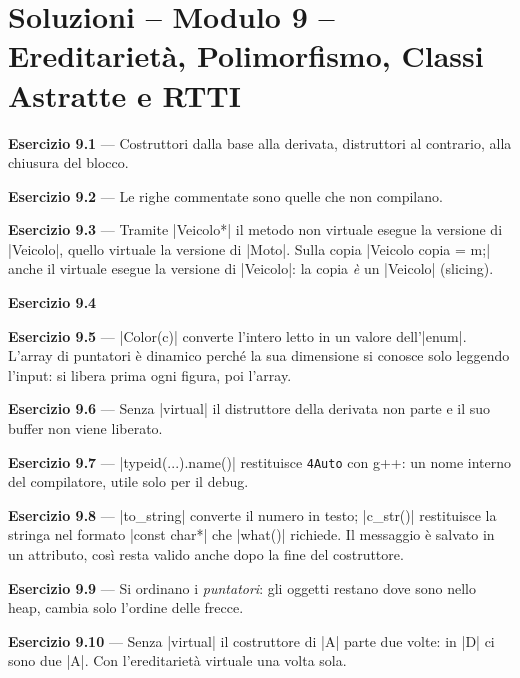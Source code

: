 \chapter{Soluzioni -- Modulo 9 -- Ereditarietà, Polimorfismo, Classi Astratte e RTTI}

\textbf{Esercizio 9.1} --- Costruttori dalla base alla derivata, distruttori al
contrario, alla chiusura del blocco.

\textbf{Esercizio 9.2} --- Le righe commentate sono quelle che non compilano.

\textbf{Esercizio 9.3} --- Tramite \cc|Veicolo*| il metodo non virtuale esegue la
versione di \cc|Veicolo|, quello virtuale la versione di \cc|Moto|. Sulla copia
\cc|Veicolo copia = m;| anche il virtuale esegue la versione di \cc|Veicolo|: la copia
\emph{è} un \cc|Veicolo| (slicing).

\textbf{Esercizio 9.4}

\textbf{Esercizio 9.5} --- \cc|Color(c)| converte l'intero letto in un valore
dell'\cc|enum|. L'array di puntatori è dinamico perché la sua dimensione si conosce solo
leggendo l'input: si libera prima ogni figura, poi l'array.

\textbf{Esercizio 9.6} --- Senza \cc|virtual| il distruttore della derivata non parte e
il suo buffer non viene liberato.

\textbf{Esercizio 9.7} --- \cc|typeid(...).name()| restituisce \texttt{4Auto} con g++:
un nome interno del compilatore, utile solo per il debug.

\textbf{Esercizio 9.8} --- \cc|to_string| converte il numero in testo; \cc|c_str()|
restituisce la stringa nel formato \cc|const char*| che \cc|what()| richiede. Il messaggio
è salvato in un attributo, così resta valido anche dopo la fine del costruttore.

\textbf{Esercizio 9.9} --- Si ordinano i \emph{puntatori}: gli oggetti restano dove
sono nello heap, cambia solo l'ordine delle frecce.

\textbf{Esercizio 9.10} --- Senza \cc|virtual| il costruttore di \cc|A| parte due volte:
in \cc|D| ci sono due \cc|A|. Con l'ereditarietà virtuale una volta sola.
